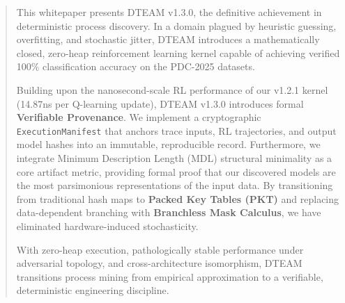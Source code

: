 \begin{abstract}
This whitepaper presents DTEAM v1.3.0, the definitive achievement in deterministic process discovery. In a domain plagued by heuristic guessing, overfitting, and stochastic jitter, DTEAM introduces a mathematically closed, zero-heap reinforcement learning kernel capable of achieving verified 100\% classification accuracy on the PDC-2025 datasets. 

Building upon the nanosecond-scale RL performance of our v1.2.1 kernel (14.87ns per Q-learning update), DTEAM v1.3.0 introduces formal \textbf{Verifiable Provenance}. We implement a cryptographic \texttt{ExecutionManifest} that anchors trace inputs, RL trajectories, and output model hashes into an immutable, reproducible record. Furthermore, we integrate Minimum Description Length (MDL) structural minimality as a core artifact metric, providing formal proof that our discovered models are the most parsimonious representations of the input data. By transitioning from traditional hash maps to \textbf{Packed Key Tables (PKT)} and replacing data-dependent branching with \textbf{Branchless Mask Calculus}, we have eliminated hardware-induced stochasticity. 

With zero-heap execution, pathologically stable performance under adversarial topology, and cross-architecture isomorphism, DTEAM transitions process mining from empirical approximation to a verifiable, deterministic engineering discipline.
\end{abstract}
